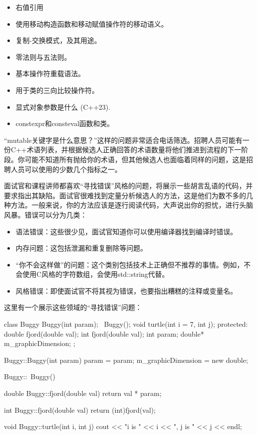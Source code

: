 \begin{itemize}
\item
右值引用

\item
使用移动构造函数和移动赋值操作符的移动语义。

\item
复制-交换模式，及其用途。

\item
零法则与五法则。

\item
基本操作符重载语法。

\item
用于类的三向比较操作符。

\item
显式对象参数是什么 (C++23).

\item
constexpr和consteval函数和类。
\end{itemize}


“mutable关键字是什么意思？”这样的问题非常适合电话筛选。招聘人员可能有一份C++术语列表，并根据候选人正确回答的术语数量将他们推进到流程的下一阶段。你可能不知道所有抛给你的术语，但其他候选人也面临着同样的问题，这是招聘人员可以使用的少数几个指标之一。

面试官和课程讲师都喜欢“寻找错误”风格的问题，将展示一些胡言乱语的代码，并要求指出其缺陷。面试官很难找到定量分析候选人的方法，这是他们为数不多的几种方法。一般来说，你的方法应该是逐行阅读代码，大声说出你的担忧，进行头脑风暴。错误可以分为几类：

\begin{itemize}
\item
语法错误：这些很少见，面试官知道你可以使用编译器找到编译时错误。

\item
内存问题：这包括泄漏和重复删除等问题。

\item
“你不会这样做”的问题：这个类别包括技术上正确但不推荐的事情。例如，不会使用C风格的字符数组，会使用std::string代替。

\item
风格错误：即使面试官不将其视为错误，也要指出糟糕的注释或变量名。
\end{itemize}

这里有一个展示这些领域的“寻找错误”问题：

\begin{cpp}
class Buggy
{
    Buggy(int param);
    ~Buggy();
    void turtle(int i = 7, int j);
    protected:
    double fjord(double val);
    int fjord(double val);
    int param;
    double* m_graphicDimension;
};

Buggy::Buggy(int param)
{
    param = param;
    m_graphicDimension = new double;
}

Buggy::~Buggy()
{}

double Buggy::fjord(double val)
{
    return val * param;
}

int Buggy::fjord(double val)
{
    return (int)fjord(val);
}

void Buggy::turtle(int i, int j)
{
    cout << "i is " << i << ", j is " << j << endl;
}
\end{cpp}

